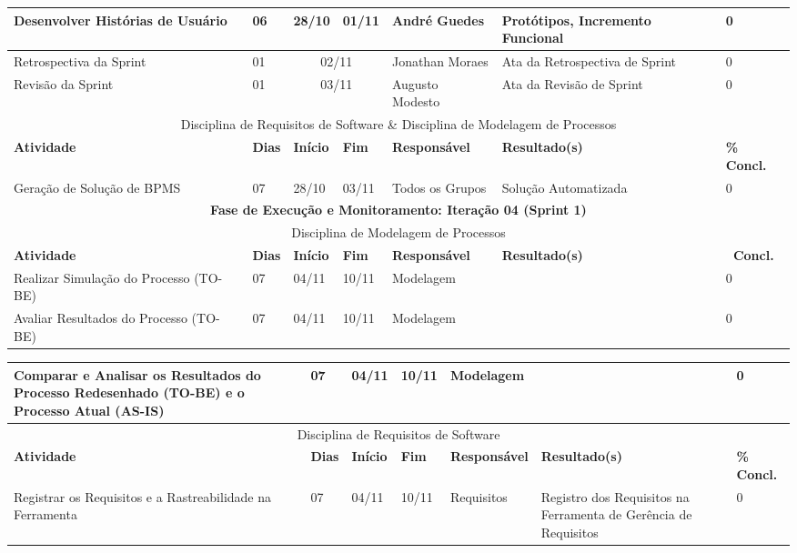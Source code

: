\begin{landscape}
\begin{center}
\begin{tabular}{|m{6cm}|m{1cm}|m{1cm}|m{1cm}|m{4cm}|m{6cm}|m{2cm}|}
			Desenvolver Histórias de Usuário & 06 & 28/10 & 01/11 & André Guedes & Protótipos, Incremento Funcional & 0 \\ \hline
			Retrospectiva da Sprint & 01 & \multicolumn{2}{c|}{02/11} & Jonathan Moraes & Ata da Retrospectiva de Sprint & 0 \\ \hline
			Revisão da Sprint & 01 & \multicolumn{2}{c|}{03/11} & Augusto Modesto & Ata da Revisão de Sprint & 0 \\ \hline
			\multicolumn{7}{|c|}{Disciplina de Requisitos de Software \& Disciplina de Modelagem de Processos} \\ \hline
			\textbf{Atividade} & \textbf{Dias} & \textbf{Início} & \textbf{Fim} & \textbf{Responsável} & \textbf{Resultado(s)} & \textbf{\% Concl.} \\ \hline
			Geração de Solução de BPMS & 07 & 28/10 & 03/11 & Todos os Grupos & Solução Automatizada & 0 \\ \hline
			\multicolumn{7}{|c|}{\textbf{Fase de Execução e Monitoramento: Iteração 04 (Sprint 1)}} \\
			\hline
			\multicolumn{7}{|c|}{Disciplina de Modelagem de Processos} \\
			\hline
			\textbf{Atividade} & \textbf{Dias} & \textbf{Início} & \textbf{Fim} & \textbf{Responsável} & \textbf{Resultado(s)} & \textbf{\ Concl.} \\ \hline
			Realizar Simulação do Processo (TO-BE) & 07 & 04/11 & 10/11 & Modelagem & & 0 \\ \hline
			Avaliar Resultados do Processo (TO-BE) & 07 & 04/11 & 10/11 & Modelagem & & 0 \\ \hline
			\end{tabular}
		\end{center}
		\begin{center}
			\begin{tabular}{|m{6cm}|m{1cm}|m{1cm}|m{1cm}|m{4cm}|m{6cm}|m{2cm}|}
			\hline
			Comparar e Analisar os Resultados do Processo Redesenhado (TO-BE) e o Processo Atual (AS-IS) & 07 & 04/11 & 10/11 & Modelagem & & 0 \\ \hline
			\multicolumn{7}{|c|}{Disciplina de Requisitos de Software} \\
			\hline
			\textbf{Atividade} & \textbf{Dias} & \textbf{Início} & \textbf{Fim} & \textbf{Responsável} & \textbf{Resultado(s)} & \textbf{\% Concl.} \\ \hline
			Registrar os Requisitos e a Rastreabilidade na Ferramenta & 07 & 04/11 & 10/11 & Requisitos & Registro dos Requisitos na Ferramenta de Gerência de Requisitos & 0 \\ \hline

\end{tabular}
\end{center}
\end{landscape}
